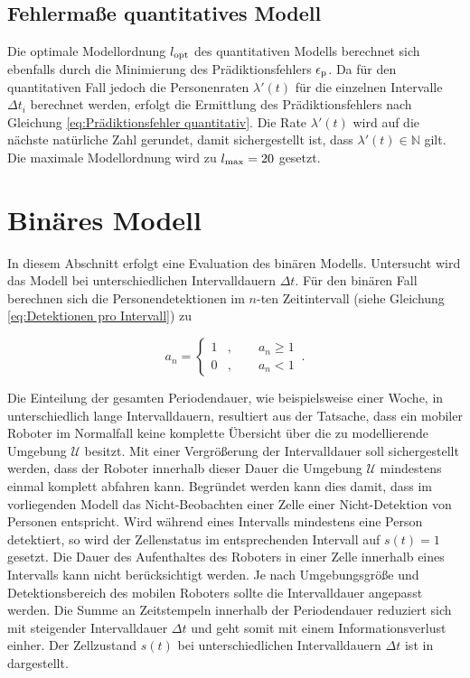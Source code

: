 \subsection{Fehlermaße quantitatives Modell}
\label{sec.Fehlermaße quantitatives Modell}
Die optimale Modellordnung $l_{\mathrm{opt}}$ des quantitativen Modells berechnet sich ebenfalls durch die Minimierung des Prädiktionsfehlers $\epsilon_{\mathrm{p}}$. Da für den quantitativen Fall jedoch die Personenraten $\lambda' (t)$ für die einzelnen Intervalle $\Delta t_i$ berechnet werden, erfolgt die Ermittlung des Prädiktionsfehlers nach Gleichung \ref{eq:Prädiktionsfehler quantitativ}.
Die Rate $\lambda ' (t)$ wird auf die nächste natürliche Zahl gerundet, damit sichergestellt ist, dass $\lambda ' (t) \in \mathbb{N}$ gilt. Die maximale Modellordnung wird zu $l_{\mathrm{max}} = 20$ gesetzt.
\section{Binäres Modell}
\label{sec.Binäres Modell}
In diesem Abschnitt erfolgt eine Evaluation des binären Modells. Untersucht wird das Modell bei unterschiedlichen Intervalldauern $\Delta t$. Für den binären Fall berechnen sich die Personendetektionen im $n$-ten Zeitintervall (siehe Gleichung \ref{eq:Detektionen pro Intervall}) zu

\begin{equation}\label{eq:Fallunterscheidung a_n}
	a_n = \begin{cases}
		1 & , \qquad a_n \geq 1 \\
		0 & , \qquad a_n < 1 \, 
	\end{cases} .
\end{equation}

Die Einteilung der gesamten Periodendauer, wie beispielsweise einer Woche, in unterschiedlich lange Intervalldauern, resultiert aus der Tatsache, dass ein mobiler Roboter im Normalfall keine komplette Übersicht über die zu modellierende Umgebung $\mathcal{U}$ besitzt. Mit einer Vergrößerung der Intervalldauer soll sichergestellt werden, dass der Roboter innerhalb dieser Dauer die Umgebung $\mathcal{U}$ mindestens einmal komplett abfahren kann. Begründet werden kann dies damit, dass im vorliegenden Modell das Nicht-Beobachten einer Zelle einer Nicht-Detektion von Personen entspricht. Wird während eines Intervalls mindestens eine Person detektiert, so wird der Zellenstatus im entsprechenden Intervall auf $s(t) = 1$ gesetzt. Die Dauer des Aufenthaltes des Roboters in einer Zelle innerhalb eines Intervalls kann nicht berücksichtigt werden. Je nach Umgebungsgröße und Detektionsbereich des mobilen Roboters sollte die Intervalldauer angepasst werden. Die Summe an Zeitstempeln innerhalb der Periodendauer reduziert sich mit steigender Intervalldauer $\Delta t$ und geht somit mit einem Informationsverlust einher. Der Zellzustand $s(t)$ bei unterschiedlichen Intervalldauern $\Delta t$ ist in  dargestellt. 



